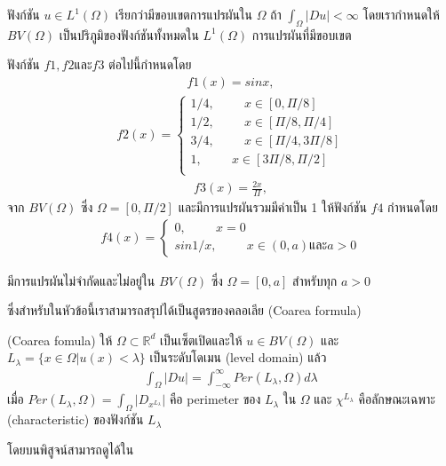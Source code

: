 ฟังก์ชัน $u \in L^1 (\Omega)$ เรียกว่ามีขอบเขตการแปรผันใน $\Omega$ ถ้า $\int_\Omega |Du| < \infty$ โดยเรากำหนดให้ $BV(\Omega)$ เป็นปริภูมิของฟังก์ชันทั้งหมดใน $L^1(\Omega)$ การแปรผันที่มีขอบเขต
\begin{Example}
    ฟังก์ชัน $f1, f2 \text{และ} f3 $ ต่อไปนี้กำหนดโดย
    \begin{align}
        f1(x) = sin x,
    \end{align}
    \begin{align}
        f2(x) = \left\{
            \begin{array}{ll}
              1/4, \hspace{1cm}  x \in [0,\Pi/8] \\
              1/2, \hspace{1cm}  x \in [\Pi/8,\Pi/4] \\
              3/4, \hspace{1cm}  x \in [\Pi/4,3\Pi/8] \\
              1, \hspace{1cm}  x \in [3\Pi/8,\Pi/2] \\
            \end{array}
          \right.
    \end{align}
    \begin{align}
        f3(x) = \frac{2x}{\Pi},
    \end{align}
    จาก $BV(\Omega)$ ซึ่ง $\Omega = [0, \Pi/2]$ และมีการแปรผันรวมมีค่าเป็น 1 ให้ฟังก์ชัน $f4$ กำหนดโดย
    \begin{align}
        f4(x) = \left\{ 
            \begin{array}{ll}
                0, \hspace{1cm}  x = 0 \\
                sin 1/x, \hspace{1cm} x \in (0,a) \text{และ} a > 0
            \end{array}
        \right.
    \end{align}
    
    มีการแปรผันไม่จำกัดและไม่อยู่ใน $BV(\Omega)$ ซึ่ง $\Omega = [0,a]$ สำหรับทุก $a > 0$
    
\end{Example}

ซึ่งสำหรับในหัวข้อนี้เราสามารถสรุปได้เป็นสูตรของคลอเลีย (Coarea formula)

\begin{Theorem} (Coarea fomula) ให้ $\Omega \subset \mathbb{R}^d$ เป็นเซ็ตเปิดและให้ $ u \in BV(\Omega)$ และ $L_{\lambda} = \{ x \in \Omega | u(x) < \lambda \}$ เป็นระดับโดเมน (level domain) แล้ว
    \begin{align*}
        \int_{\Omega} | D u | = \int_{- \infty}^{\infty} Per(L_{\lambda}, \Omega) d \lambda
    \end{align*}
    เมื่อ $Per(L_{\lambda}, \Omega) = \int_{\Omega} |D_{x^{L_{\lambda}}}|$ คือ perimeter ของ $L_{\lambda}$ ใน $\Omega$ และ $\chi^{L_{\lambda}}$ คือลักษณะเฉพาะ (characteristic) ของฟังก์ชัน $L_{\lambda}$

    โดยบนพิสูจน์สามารถดูได้ใน \cite{ref:bounded_variation} 
\end{Theorem}